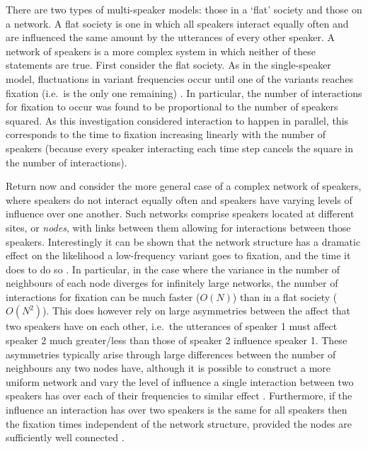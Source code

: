 \documentclass[12pt]{article}
\begin{document}
There are two types of multi-speaker models: those in a `flat' society and those on a network. A flat society is one in which all speakers interact equally often and are influenced the same amount by the utterances of every other speaker. A network of speakers is a more complex system in which neither of these statements are true. First consider the flat society. As in the single-speaker model, fluctuations in variant frequencies occur until one of the variants reaches fixation (i.e.\ is the only one remaining) \cite{USM}. In particular, the number of interactions for fixation to occur was found to be proportional to the number of speakers squared. As this investigation considered interaction to happen in parallel, this corresponds to the time to fixation increasing linearly with the number of speakers (because every speaker interacting each time step cancels the square in the number of interactions). 
%

Return now and consider the more general case of a complex network of speakers, where speakers do not interact equally often and speakers have varying levels of influence over one another. Such networks comprise speakers located at different sites, or \emph{nodes}, with links between them allowing for interactions between those speakers. Interestingly it can be shown that the network structure has a dramatic effect on the likelihood a low-frequency variant goes to fixation, and the time it does to do so \cite{ref12}. In particular, in the case where the variance in the number of neighbours of each node diverges for infinitely large networks, the number of interactions for fixation can be much faster ($O(N)$) than in a flat society ($O(N^2)$). This does however rely on large asymmetries between the affect that two speakers have on each other, i.e.\ the utterances of speaker 1 must affect speaker 2 much greater/less than those of speaker 2 influence speaker 1. These asymmetries typically arise through large differences between the number of neighbours any two nodes have, although it is possible to construct a more uniform network and vary the level of influence a single interaction between two speakers has over each of their frequencies to similar effect \cite{ref15}. Furthermore, if the influence an interaction has over two speakers is the same for all speakers then the fixation times independent of the network structure, provided the nodes are sufficiently well connected \cite{ref12}. 
\end{document}
